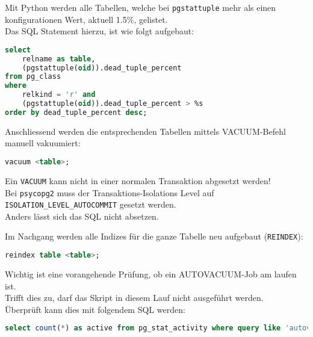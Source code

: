 \begin{flushleft}
    Mit Python werden alle Tabellen, welche bei \texttt{pgstattuple} mehr als einen konfigurationen Wert, aktuell 1.5\%, gelistet.\\
    Das SQL Statement hierzu, ist wie folgt aufgebaut:
    \lstset{style=gra_codestyle}
    \begin{lstlisting}[language=sql, caption=Maintenance-Tool - List - Maintenance-Tool - Bloated Tables / Indices,captionpos=b,label={lst:maintenannce-tool-list-bloated-tables},breaklines=true]
select
    relname as table,
    (pgstattuple(oid)).dead_tuple_percent
from pg_class
where
    relkind = 'r' and
    (pgstattuple(oid)).dead_tuple_percent > %s
order by dead_tuple_percent desc;
    \end{lstlisting}
    Anschliessend werden die entsprechenden Tabellen mittels VACUUM-Befehl manuell vakuumiert:
    \lstset{style=gra_codestyle}
    \begin{lstlisting}[language=sql, caption=Maintenance-Tool - VACUUM - Maintenance-Tool - Bloated Tables / Indices,captionpos=b,label={lst:maintenannce-tool-vacuum-bloated-tables},breaklines=true]
vacuum <table>;
    \end{lstlisting}
    \begin{warning}
        Ein \texttt{VACUUM} kann nicht in einer normalen Transaktion abgesetzt werden!\\
        Bei \texttt{psycopg2} muss der Transaktions-Isolations Level auf \texttt{ISOLATION\_LEVEL\_AUTOCOMMIT} gesetzt werden.\\
        Anders lässt sich das SQL nicht absetzen.
    \end{warning}
    Im Nachgang werden alle Indizes für die ganze Tabelle neu aufgebaut (\texttt{REINDEX}):
    \lstset{style=gra_codestyle}
    \begin{lstlisting}[language=sql, caption=Maintenance-Tool - REINDEX - Maintenance-Tool - Bloated Tables / Indices,captionpos=b,label={lst:maintenannce-tool-reindex-bloated-tables},breaklines=true]
reindex table <table>;
    \end{lstlisting}
\end{flushleft}
\begin{flushleft}
    Wichtig ist eine vorangehende Prüfung, ob ein \Gls{AUTOVACUUM}-Job am laufen ist.\\
    Trifft dies zu, darf das Skript in diesem Lauf nicht ausgeführt werden.\\
    Überprüft kann dies mit folgendem SQL werden:
    \lstset{style=gra_codestyle}
    \begin{lstlisting}[language=sql, caption=Maintenance-Tool - Check AUTOVACUUM - Maintenance-Tool - Bloated Tables / Indices,captionpos=b,label={lst:maintenannce-tool-check-autovacuum-bloated-tables},breaklines=true]
select count(*) as active from pg_stat_activity where query like 'autovacuum:%';
    \end{lstlisting}
\end{flushleft}
